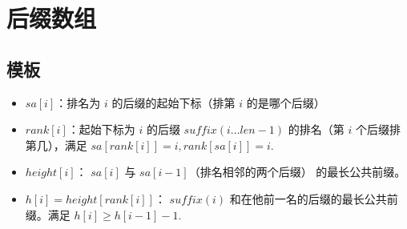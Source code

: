 \section{后缀数组}

\subsection{模板}
\begin{itemize}
    \item $sa[i]$：排名为 $i$ 的后缀的起始下标（排第 $i$ 的是哪个后缀）
    \item $rank[i]$：起始下标为 $i$ 的后缀 $suffix(i ... len-1)$ 的排名（第 $i$ 个后缀排第几），满足 $sa[rank[i]] = i, rank[sa[i]] = i$.
    \item $height[i]$： $sa[i]$ 与 $sa[i-1]$（排名相邻的两个后缀） 的最长公共前缀。
    \item $h[i] = height[rank[i]]$： $suffix(i)$ 和在他前一名的后缀的最长公共前缀。满足 $h[i] \ge h[i-1] - 1$.
\end{itemize}


